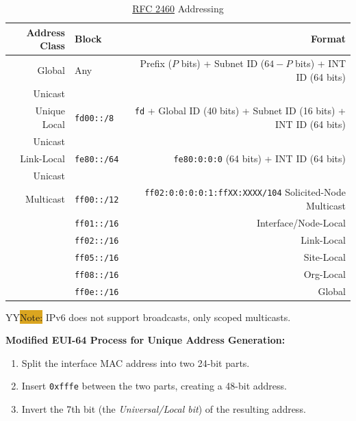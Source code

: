 \documentclass[12pt]{article}
\newcommand{\printColor}{Y}								%
\newcommand{\note}[1]{\if\printColor Y{\colorbox{#1}{Note:}}\else{\underline{Note:}}\fi}
\newcommand{\RFC}[1]{\href{https://datatracker.ietf.org/doc/html/rfc#1}{RFC #1}}
\begin{document}
	\begin{table}[H]
	\centering
	\caption{\RFC{2460} Addressing \label{tab:ADDRESSING IPV6}}
	\begin{tabular}{rlr}\hline
	\textbf{Address Class}	& \textbf{Block}		& \textbf{Format}\\\hline
	Global 			& Any			& Prefix ($P$ bits) + Subnet ID ($64-P$ bits) + INT ID (64 bits)\\
	Unicast			&				&\\\hline
	Unique Local 		& \texttt{fd00::/8}		& \texttt{fd} + Global ID (40 bits) + Subnet ID (16 bits) + INT ID (64 bits)\\
	Unicast			&				&\\\hline
	Link-Local 			& \texttt{fe80::/64}	& \texttt{fe80:0:0:0} (64 bits) + INT ID (64 bits)\\
	Unicast			&				&\\\hline
	Multicast			& \texttt{ff00::/12}	& \texttt{ff02:0:0:0:0:1:ffXX:XXXX/104} Solicited-Node Multicast\\
					& \texttt{ff01::/16}	& Interface/Node-Local\\
					& \texttt{ff02::/16}	& Link-Local\\
					& \texttt{ff05::/16}	& Site-Local\\
					& \texttt{ff08::/16}	& Org-Local\\
					& \texttt{ff0e::/16}	& Global\\\hline
	\end{tabular}\end{table}
	\note{Goldenrod} IPv6 does not support broadcasts, only scoped multicasts.

	\textbf{Modified EUI-64 Process for Unique Address Generation:}
	\begin{enumerate} \itemsep -5pt
		\label{itm:EUI64}
		\item{Split the interface MAC address into two 24-bit parts.}
		\item{Insert \texttt{0xfffe} between the two parts, creating a 48-bit address.}
		\item{Invert the 7th bit (the \textit{Universal/Local bit}) of the resulting address.}
	\end{enumerate}

\end{document}
